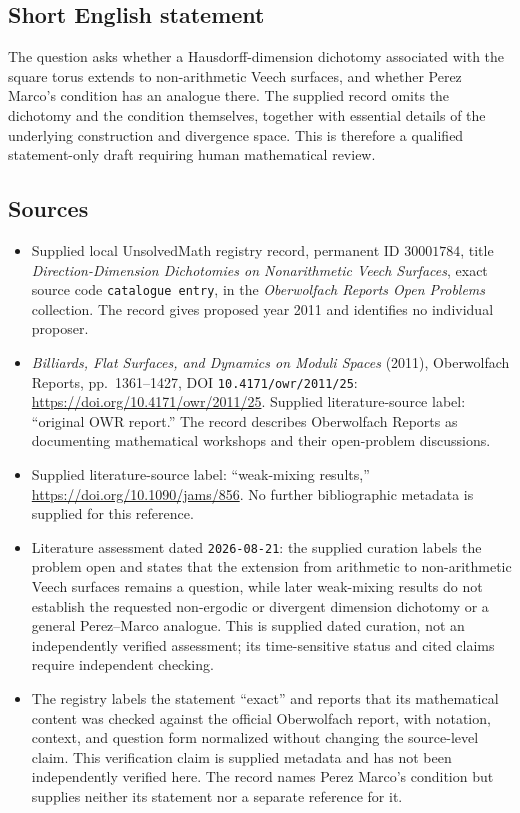 \documentclass[11pt]{article}
\begin{document}
\subsection{Short English statement}
The question asks whether a Hausdorff-dimension dichotomy associated with the square torus extends to non-arithmetic Veech surfaces, and whether Perez Marco's condition has an analogue there. The supplied record omits the dichotomy and the condition themselves, together with essential details of the underlying construction and divergence space. This is therefore a qualified statement-only draft requiring human mathematical review.
\subsection{Sources}
\begin{itemize}
\item Supplied local UnsolvedMath registry record, permanent ID \(30001784\), title \emph{Direction-Dimension Dichotomies on Nonarithmetic Veech Surfaces}, exact source code \texttt{catalogue entry}, in the \emph{Oberwolfach Reports Open Problems} collection. The record gives proposed year 2011 and identifies no individual proposer.
\item \emph{Billiards, Flat Surfaces, and Dynamics on Moduli Spaces} (2011), Oberwolfach Reports, pp.\ 1361--1427, DOI \texttt{10.4171/owr/2011/25}: \url{https://doi.org/10.4171/owr/2011/25}. Supplied literature-source label: ``original OWR report.'' The record describes Oberwolfach Reports as documenting mathematical workshops and their open-problem discussions.
\item Supplied literature-source label: ``weak-mixing results,'' \url{https://doi.org/10.1090/jams/856}. No further bibliographic metadata is supplied for this reference.
\item Literature assessment dated \texttt{2026-08-21}: the supplied curation labels the problem open and states that the extension from arithmetic to non-arithmetic Veech surfaces remains a question, while later weak-mixing results do not establish the requested non-ergodic or divergent dimension dichotomy or a general Perez--Marco analogue. This is supplied dated curation, not an independently verified assessment; its time-sensitive status and cited claims require independent checking.
\item The registry labels the statement ``exact'' and reports that its mathematical content was checked against the official Oberwolfach report, with notation, context, and question form normalized without changing the source-level claim. This verification claim is supplied metadata and has not been independently verified here. The record names Perez Marco's condition but supplies neither its statement nor a separate reference for it.
\end{itemize}
\end{document}
